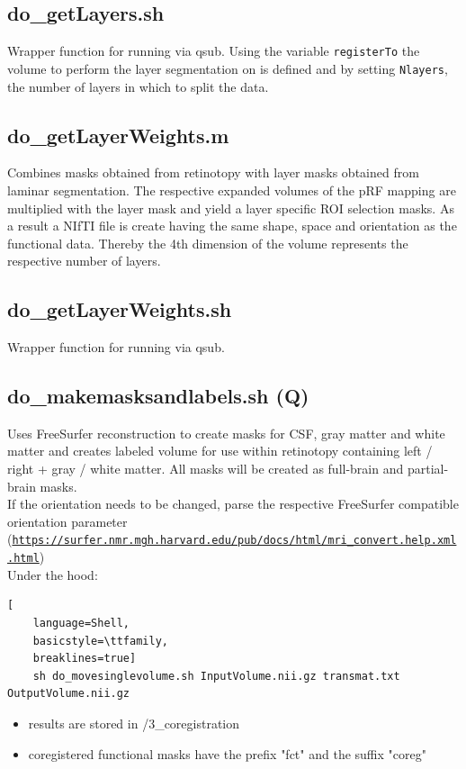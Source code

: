 \documentclass[12pt,a4paper]{scrartcl}
\begin{document}
\subsection{do\_getLayers.sh}
\label{sh:getLyr}
Wrapper function for running \texttt{} via qsub. Using the variable \texttt{registerTo} the volume to perform the layer segmentation on is defined and by setting \texttt{Nlayers}, the number of layers in which to split the data.\\

\subsection{do\_getLayerWeights.m}
\label{m:getLyrW}
Combines masks obtained from retinotopy with layer masks obtained from laminar segmentation. The respective expanded volumes of the pRF mapping are multiplied with the layer mask and yield a layer specific ROI selection masks. As a result a NIfTI file is create having the same shape, space and orientation as the functional data. Thereby the 4th dimension of the volume represents the respective number of layers.\\

\subsection{do\_getLayerWeights.sh}
\label{sh:getLyrW}
Wrapper function for running \texttt{} via qsub.\\

\subsection{do\_makemasksandlabels.sh (Q)}
\label{sh:msklbl}
Uses FreeSurfer reconstruction to create masks for CSF, gray matter and white matter and creates labeled volume for use within retinotopy containing left / right + gray / white matter. All masks will be created as full-brain and partial-brain masks.\\

\noindent If the orientation needs to be changed, parse the respective FreeSurfer compatible orientation parameter (\href{https://surfer.nmr.mgh.harvard.edu/pub/docs/html/mri_convert.help.xml.html}{\nolinkurl{https://surfer.nmr.mgh.harvard.edu/pub/docs/html/mri\_convert.help.xml.html}})\\

\noindent Under the hood:
\begin{lstlisting}[
    language=Shell,
    basicstyle=\ttfamily,
    breaklines=true]
    sh do_movesinglevolume.sh InputVolume.nii.gz transmat.txt OutputVolume.nii.gz
\end{lstlisting}
\begin{itemize}
\item results are stored in /3\_coregistration
\item coregistered functional masks have the prefix "fct" and the suffix "coreg"
\end{itemize}
\end{document}
